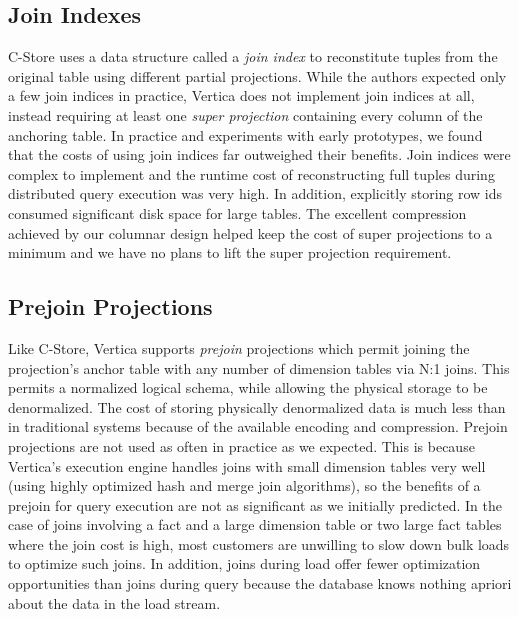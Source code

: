 \documentclass[a4paper,12pt,notitlepage,twoside,openright]{article}
\begin{document}
\hypertarget{join-indexes}{%
\subsection{Join Indexes}\label{join-indexes}}

C-Store uses a data structure called a \emph{join index} to reconstitute
tuples from the original table using different partial projections.
While the authors expected only a few join indices in practice, Vertica
does not implement join indices at all, instead requiring at least one
\emph{super projection} containing every column of the anchoring table.
In practice and experiments with early prototypes, we found that the
costs of using join indices far outweighed their benefits. Join indices
were complex to implement and the runtime cost of reconstructing full
tuples during distributed query execution was very high. In addition,
explicitly storing row ids consumed significant disk space for large
tables. The excellent compression achieved by our columnar design helped
keep the cost of super projections to a minimum and we have no plans to
lift the super projection requirement.

\hypertarget{prejoin-projections}{%
\subsection{Prejoin Projections}\label{prejoin-projections}}

Like C-Store, Vertica supports \emph{prejoin} projections which permit
joining the projection's anchor table with any number of dimension
tables via N:1 joins. This permits a normalized logical schema, while
allowing the physical storage to be denormalized. The cost of storing
physically denormalized data is much less than in traditional systems
because of the available encoding and compression. Prejoin projections
are not used as often in practice as we expected. This is because
Vertica's execution engine handles joins with small dimension tables
very well (using highly optimized hash and merge join algorithms), so
the benefits of a prejoin for query execution are not as significant as
we initially predicted. In the case of joins involving a fact and a
large dimension table or two large fact tables where the join cost is
high, most customers are unwilling to slow down bulk loads to optimize
such joins. In addition, joins during load offer fewer optimization
opportunities than joins during query because the database knows nothing
apriori about the data in the load stream.
\end{document}
